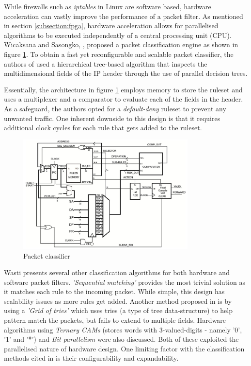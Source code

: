 While firewalls such as \textit{iptables} in Linux are software based, hardware acceleration can vastly improve the performance of a packet filter. As mentioned in section \ref{subsection:fpga}, hardware acceleration allows for parallelised algorithms to be executed independently of a central processing unit (CPU). Wicaksana and Sasongko, \cite{FastRecongifFPGAFirewall}, proposed a packet classification engine as shown in figure \ref{fig:fast-fpga-classifier}. To obtain a fast yet reconfigurable and scalable packet classifier, the authors of \cite{FastRecongifFPGAFirewall} used a hierarchical tree-based algorithm that inspects the multidimensional fields of the IP header through the use of parallel decision trees.

Essentially, the architecture in figure \ref{fig:fast-fpga-classifier} employs memory to store the ruleset and uses a multiplexer and a comparator to evaluate each of the fields in the header. As a safeguard, the authors opted for a \textit{default-deny} ruleset to prevent any unwanted traffic. One inherent downside to this design is that it requires additional clock cycles for each rule that gets added to the ruleset. 


\begin{figure}[h]
    \centering
    \includegraphics[width=0.8\textwidth]{Images/packetFilterHardware.png}
    \caption[Packet classifier]{Packet classifier \cite{FastRecongifFPGAFirewall}}
    \label{fig:fast-fpga-classifier}
\end{figure}


\noindent Wasti \cite{Wasti2001HardwareAP} presents several other classification algorithms for both hardware and software packet filters. \textit{'Sequential matching'} provides the most trivial solution as it matches each rule to the incoming packet. While simple, this design has scalability issues as more rules get added. Another method proposed in \cite{Wasti2001HardwareAP} is by using a \textit{'Grid of tries'} which uses tries (a type of tree data-structure) to help pattern match the packets, but fails to extend to multiple fields. 
Hardware algorithms using \textit{Ternary CAMs} (stores words with 3-valued-digits - namely '0', '1' and '*') and \textit{Bit-parallelism} were also discussed. Both of these exploited the parallelised nature of hardware design. One limiting factor with the classification methods cited in \cite{Wasti2001HardwareAP} is their configurability and expandability. 









